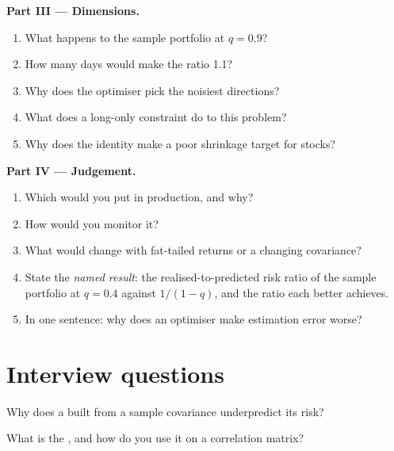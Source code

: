 \begin{problem}
\medskip\noindent\textbf{Part III --- Dimensions.}
\begin{enumerate}[resume]
\item What happens to the sample portfolio at $q = 0.9$?
\item How many days would make the ratio 1.1?
\item Why does the optimiser pick the noisiest directions?
\item What does a long-only constraint do to this problem?
\item Why does the identity make a poor shrinkage target for stocks?
\end{enumerate}

\medskip\noindent\textbf{Part IV --- Judgement.}
\begin{enumerate}[resume]
\item Which  would you put in production, and why?
\item How would you monitor it?
\item What would change with fat-tailed returns or a changing covariance?
\item State the \emph{named result}: the realised-to-predicted risk ratio of the sample portfolio at $q = 0.4$ against $1/(1 - q)$, and the ratio each better  achieves.
\item In one sentence: why does an optimiser make estimation error worse?
\end{enumerate}
\end{problem}

\section{Interview questions}

\begin{interviewq}\label{iq:qm:covariance-estimation-and-random-matrices:1}
Why does a  built from a sample covariance underpredict its risk?
\end{interviewq}

\begin{interviewq}\label{iq:qm:covariance-estimation-and-random-matrices:2}
What is the , and how do you use it on a correlation matrix?
\end{interviewq}


